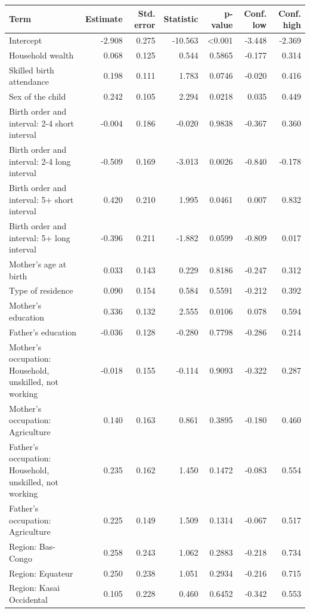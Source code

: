 \documentclass[
  11pt,
  a4paper,
]{article}
\begin{document}
\begin{longtable}[t]{>{\raggedleft\arraybackslash}p{4.5cm}rrrrrr}
\\
\toprule
\textbf{Term} & \textbf{Estimate} & \textbf{Std. error} & \textbf{Statistic} & \textbf{p-value} & \textbf{Conf. low} & \textbf{Conf. high}\\
\midrule
Intercept & -2.908 & 0.275 & -10.563 & <0.001 & -3.448 & -2.369\\
Household wealth & 0.068 & 0.125 & 0.544 & 0.5865 & -0.177 & 0.314\\
Skilled birth attendance & 0.198 & 0.111 & 1.783 & 0.0746 & -0.020 & 0.416\\
Sex of the child & 0.242 & 0.105 & 2.294 & 0.0218 & 0.035 & 0.449\\
Birth order and interval: 2-4 short interval & -0.004 & 0.186 & -0.020 & 0.9838 & -0.367 & 0.360\\
\addlinespace
Birth order and interval: 2-4 long interval & -0.509 & 0.169 & -3.013 & 0.0026 & -0.840 & -0.178\\
Birth order and interval: 5+ short interval & 0.420 & 0.210 & 1.995 & 0.0461 & 0.007 & 0.832\\
Birth order and interval: 5+ long interval & -0.396 & 0.211 & -1.882 & 0.0599 & -0.809 & 0.017\\
Mother's age at birth & 0.033 & 0.143 & 0.229 & 0.8186 & -0.247 & 0.312\\
Type of residence & 0.090 & 0.154 & 0.584 & 0.5591 & -0.212 & 0.392\\
\addlinespace
Mother's education & 0.336 & 0.132 & 2.555 & 0.0106 & 0.078 & 0.594\\
Father's education & -0.036 & 0.128 & -0.280 & 0.7798 & -0.286 & 0.214\\
Mother's occupation: Household, unskilled, not working & -0.018 & 0.155 & -0.114 & 0.9093 & -0.322 & 0.287\\
Mother's occupation: Agriculture & 0.140 & 0.163 & 0.861 & 0.3895 & -0.180 & 0.460\\
Father's occupation: Household, unskilled, not working & 0.235 & 0.162 & 1.450 & 0.1472 & -0.083 & 0.554\\
\addlinespace
Father's occupation: Agriculture & 0.225 & 0.149 & 1.509 & 0.1314 & -0.067 & 0.517\\
Region: Bas-Congo & 0.258 & 0.243 & 1.062 & 0.2883 & -0.218 & 0.734\\
Region: Equateur & 0.250 & 0.238 & 1.051 & 0.2934 & -0.216 & 0.715\\
Region: Kasai Occidental & 0.105 & 0.228 & 0.460 & 0.6452 & -0.342 & 0.553\\

\end{longtable}
\end{document}
